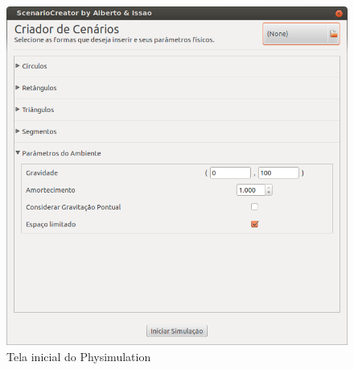 \begin{figure}[!htbp]
  \includegraphics[scale=0.5]{telaInicial.png}
  \caption{Tela inicial do Physimulation}
\end{figure}
